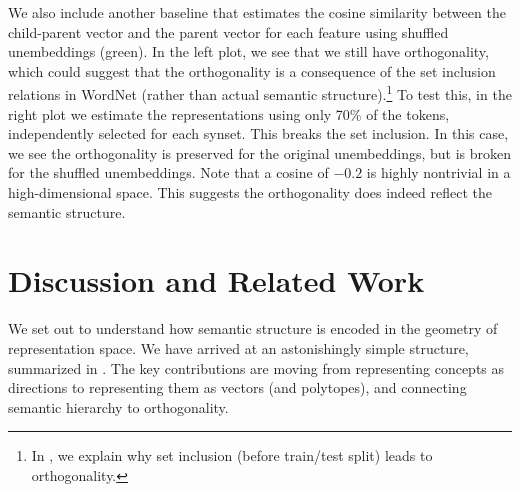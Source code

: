 \documentclass{article}
\begin{document}
We also include another baseline that estimates the cosine similarity between the child-parent vector and the parent vector for each feature using shuffled unembeddings (green).
In the left plot, we see that we still have orthogonality, which could suggest that the orthogonality is a consequence of the set inclusion relations in WordNet (rather than actual semantic structure).\footnote{In , we explain why set inclusion (before train/test split) leads to orthogonality.}
To test this, in the right plot we estimate the representations using only 70\% of the tokens, independently selected for each synset. This breaks the set inclusion. In this case, we see the orthogonality is preserved for the original unembeddings, but is broken for the shuffled unembeddings. Note that a cosine of $-0.2$ is highly nontrivial in a high-dimensional space. This suggests the orthogonality does indeed reflect the semantic structure.




\section{Discussion and Related Work}\label{sec:discussion_relatedwork}
We set out to understand how semantic structure is encoded in the geometry of representation space.
We have arrived at an astonishingly simple structure, summarized in . 
The key contributions are moving from representing concepts as directions to representing them as vectors (and polytopes), and connecting semantic hierarchy to orthogonality. 
\end{document}
